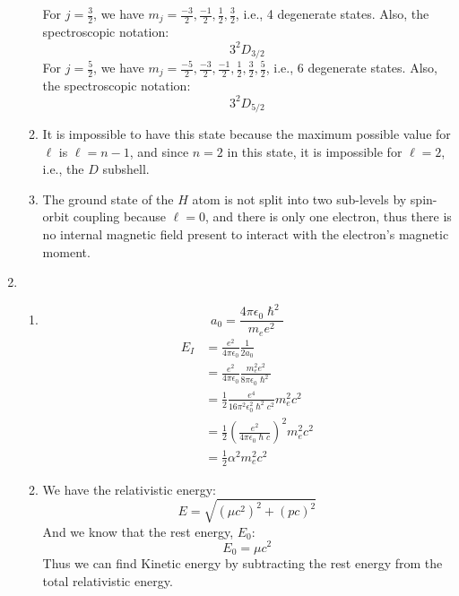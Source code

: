 \documentclass[10pt]{article}
\begin{document}
\begin{enumerate}
\begin{enumerate}
    For $ j=\frac{3}{2} $, we have $ m_j = \frac{-3}{2}, \frac{-1}{2}, \frac{1}{2}, \frac{3}{2} $, i.e., 4 degenerate states.
    Also, the spectroscopic notation:
    \begin{equation*}
      3^2D_{3 / 2}
    \end{equation*}
    For $ j=\frac{5}{2} $, we have $ m_j = \frac{-5}{2}, \frac{-3}{2}, \frac{-1}{2}, \frac{1}{2}, \frac{3}{2}, \frac{5}{2} $, i.e., 6 degenerate states.
    Also, the spectroscopic notation:
    \begin{equation*}
      3^2D_{5 / 2}
    \end{equation*}
  \item 
    It is impossible to have this state because the maximum possible value for $ \ell $ is $ \ell = n-1 $, and since $ n=2 $ in this state, it is impossible for $ \ell = 2 $, i.e., the $ D $ subshell.
  \item 
    The ground state of the $ H $ atom is not split into two sub-levels by spin-orbit coupling because $ \ell=0 $, and there is only one electron, thus there is no internal magnetic field present to interact with the electron's magnetic moment.
  \end{enumerate}
\item 
  \begin{enumerate}
  \item 
    \begin{equation*}
      a_0 = \frac{4\pi \epsilon_0 \hslash^2}{m_e e ^2}
    \end{equation*}
    \begin{align*}
      E_I &= \frac{e^2}{4 \pi \epsilon_0} \frac{1}{2 a_0} \\
      &=  \frac{e^2}{4 \pi \epsilon_0} \frac{m_e ^2 e^2}{8\pi \epsilon_0 \hslash^2} \\
      &=  \frac{1}{2} \frac{e^4}{16 \pi^2 \epsilon_0^2 \hslash^2 c^2} m_e ^2 c^2 \\
      &=  \frac{1}{2} \left(\frac{e^2}{4 \pi \epsilon_0 \hslash c}\right) ^2 m_e ^2 c^2 \\
      &=  \frac{1}{2} \alpha^2 m_e ^2 c^2
    \end{align*}
  \item 
    We have the relativistic energy:
    \[
      E = \sqrt{\left( \mu c ^2 \right)^2 + \left( pc \right)^2}
    \]
    And we know that the rest energy, $ E_0 $:
   \[
     E_0 = \mu c ^2
   \]
   Thus we can find Kinetic energy by subtracting the rest energy from the total relativistic energy.
   \begin{align*}

\end{align*}
\end{enumerate}
\end{enumerate}
\end{document}
